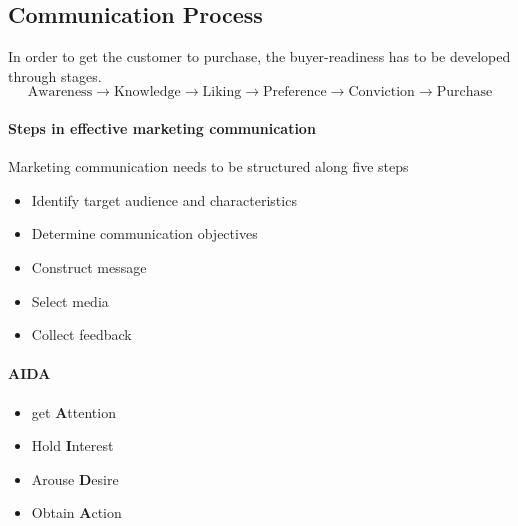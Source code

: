\documentclass[a4paper,titlepage] {scrartcl}
\begin{document}
\subsection{Communication Process}
In order to get the customer to purchase, the buyer-readiness has to be developed through stages.
\begin{equation}
	\text{Awareness}\rightarrow
	\text{Knowledge}\rightarrow
	\text{Liking}\rightarrow
	\text{Preference}\rightarrow
	\text{Conviction}\rightarrow
	\text{Purchase}
\end{equation}

\paragraph{Steps in effective marketing communication} %
\label{par:steps_in_effective_marketing_communication}
Marketing communication needs to be structured along five steps

\begin{itemize}
	\item Identify target audience and characteristics
	\item Determine communication objectives
	\item Construct message
	\item Select media
	\item Collect feedback
\end{itemize}

\paragraph{AIDA} %
\label{par:aida}
\begin{itemize}
	\item get \textbf{A}ttention
	\item Hold \textbf{I}nterest
	\item Arouse \textbf{D}esire
	\item Obtain \textbf{A}ction
\end{itemize}
\end{document}
